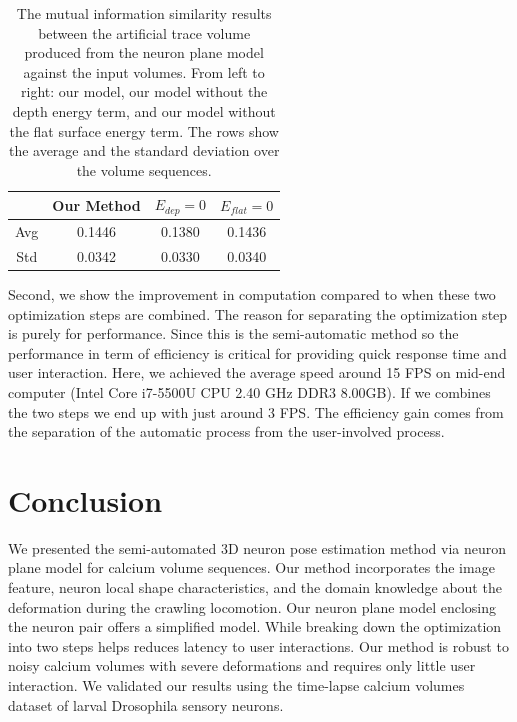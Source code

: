 \documentclass{article}
\begin{document}
\begin{table}[b]
	\centering
	\vspace{-10pt}
	\begin{tabular}{|c|c|c|c|}
		\hline 
		& Our Method & $E_{dep} = 0$ & $E_{flat} = 0$ \\ 
		\hline 
		Avg & 0.1446 & 0.1380 & 0.1436 \\ \hline
		Std & 0.0342 & 0.0330 & 0.0340 \\
		\hline 
	\end{tabular}
	\vspace{-10pt}
	\caption{\small{The mutual information similarity results between the artificial trace volume produced from the neuron plane model against the input volumes. From left to right: our model, our model without the depth energy term, and our model without the flat surface energy term. The rows show the average and the standard deviation over the volume sequences.}}
	\label{tab:result}
\end{table}


Second, we show the improvement in computation compared to when these two optimization steps are combined. The reason for separating the optimization step is purely for performance. Since this is the semi-automatic method so the performance in term of efficiency is critical for providing quick response time and user interaction. Here, we achieved the average speed around 15 FPS on mid-end computer (Intel Core i7-5500U CPU 2.40 GHz DDR3 8.00GB). If we combines the two steps we end up with just around 3 FPS. The efficiency gain comes from the separation of the automatic process from the user-involved process.


\section{Conclusion}
We presented the semi-automated 3D neuron pose estimation method via neuron plane model for calcium volume sequences. Our method incorporates the image feature, neuron local shape characteristics, and the domain knowledge about the deformation during the crawling locomotion. Our neuron plane model enclosing the neuron pair offers a simplified model. While breaking down the optimization into two steps helps reduces latency to user interactions. Our method is robust to noisy calcium volumes with severe deformations and requires only little user interaction. We validated our results using the time-lapse calcium volumes dataset of larval Drosophila sensory neurons.
\end{document}
